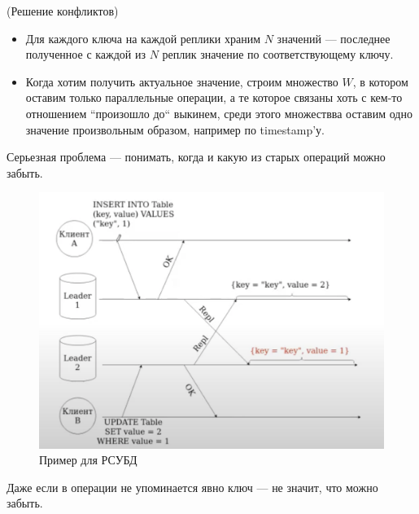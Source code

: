         \begin{algorithm}(Решение конфликтов)
          \begin{itemize}
            \item Для каждого ключа на каждой реплики храним $N$ значений --- последнее полученное с каждой из $N$ реплик значение по соответствующему ключу.
            \item Когда хотим получить актуальное значение, строим множество $W$, в котором оставим только параллельные операции, а те которое связаны хоть с кем-то отношением ``произошло до`` выкинем, среди этого множествва оставим одно значение произвольным образом, например по timestamp'у.
          \end{itemize}
        \end{algorithm}
    \begin{remark}
      Серьезная проблема --- понимать, когда и какую из старых операций можно забыть.
    \end{remark}
    \begin{example}
      \begin{figure}[h]
          \centering
          \includegraphics[scale = 0.5]{../assets/14.png}
          \caption{Пример для РСУБД}
      \end{figure}
      Даже если в операции не упоминается явно ключ --- не значит, что можно забыть.\\
    \end{example}
